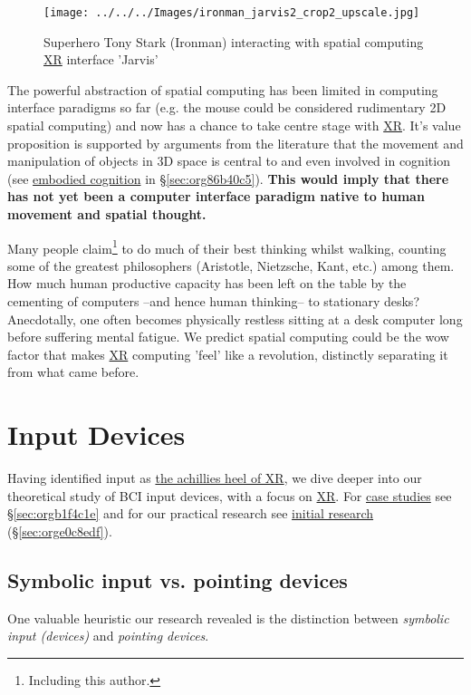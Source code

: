 \documentclass[logo,bsc,singlespacing,parskip]{infthesis}
\begin{document}
\begin{figure}[h]
\centering
\texttt{[image: ../../../Images/ironman\_jarvis2\_crop2\_upscale.jpg]}
\caption{Superhero Tony Stark (Ironman) interacting with spatial computing \hyperref[org39cbd51]{XR} interface 'Jarvis'}
\end{figure}

The powerful abstraction of spatial computing has been limited in computing interface paradigms so far (e.g. the mouse could be considered rudimentary 2D spatial computing) and now has a chance to take centre stage with \hyperref[org39cbd51]{XR}.
It's value proposition is supported by arguments from the literature that the movement and manipulation of objects in 3D space is central to and even involved in cognition (see \hyperref[orgef09c3f]{embodied cognition} in \S \ref{sec:org86b40c5}).
\textbf{This would imply that there has not yet been a computer interface paradigm native to human movement and spatial thought.}

Many people claim\footnote{Including this author.} to do much of their best thinking whilst walking, counting some of the greatest philosophers (Aristotle, Nietzsche, Kant, etc.) among them.
How much human productive capacity has been left on the table by the cementing of computers --and hence human thinking-- to stationary desks?
Anecdotally, one often becomes physically restless sitting at a desk computer long before suffering mental fatigue.
We predict spatial computing could be the wow factor that makes \hyperref[org39cbd51]{XR} computing 'feel' like a revolution, distinctly separating it from what came before.

\chapter{Input Devices}
\label{sec:org6a11140}
Having identified input as \hyperref[sec:org93500e2]{the achillies heel of XR}, we dive deeper into our theoretical study of BCI input devices, with a focus on \hyperref[org39cbd51]{XR}.
For \hyperref[sec:orgb1f4c1e]{case studies} see \S \ref{sec:orgb1f4c1e} and for our practical research see \hyperref[sec:orge0c8edf]{initial research} (\S \ref{sec:orge0c8edf}).
\section{Symbolic input vs. pointing devices}
\label{sec:org0736070}
One valuable heuristic our research revealed is the distinction between \emph{symbolic input (devices)} and \emph{pointing devices}.
\end{document}
